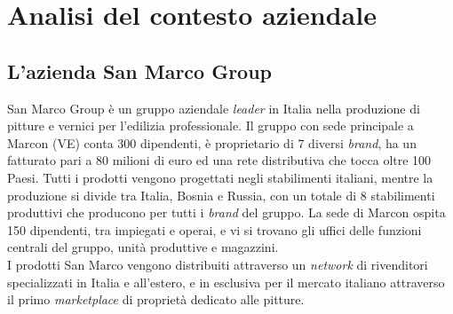 
\chapter{Analisi del contesto aziendale}
\label{cap:analisi-del-contesto-aziendale}






\section{L'azienda San Marco Group}

San Marco Group è un gruppo aziendale \textit{leader} in Italia nella produzione di pitture e vernici per l'edilizia professionale. Il gruppo con sede principale a Marcon (VE) conta 300 dipendenti, è proprietario di 7 diversi \textit{brand}, ha un fatturato pari a 80 milioni di euro ed una rete distributiva che tocca oltre 100 Paesi. Tutti i prodotti vengono progettati negli stabilimenti italiani, mentre la produzione si divide tra Italia, Bosnia e Russia, con un totale di 8 stabilimenti produttivi che producono per tutti i \textit{brand} del gruppo. La sede di Marcon ospita 150 dipendenti, tra impiegati e operai, e vi si trovano gli uffici delle funzioni centrali del gruppo, unità produttive e magazzini. \\
I prodotti San Marco vengono distribuiti attraverso un \textit{network} di rivenditori specializzati in Italia e all'estero, e in esclusiva per il mercato italiano attraverso il primo \textit{marketplace} di proprietà dedicato alle pitture.


